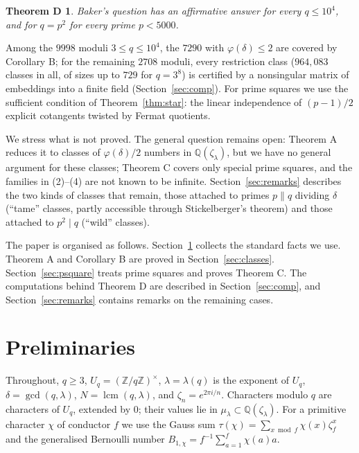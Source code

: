 \documentclass[11pt]{amsart}
\newtheorem*{mainD}{Theorem D}
\theoremstyle{definition}
\theoremstyle{remark}
\providecommand{\Q}{\mathbb Q}
\providecommand{\Z}{\mathbb Z}
\numberwithin{equation}{section}
\begin{document}
\begin{mainD}
Baker's question has an affirmative answer for every $q\le 10^4$, and for $q=p^2$ for every prime $p<5000$.
\end{mainD}

Among the $9998$ moduli $3\le q\le10^4$, the $7290$ with $\varphi(\delta)\le2$ are covered by Corollary B; for the remaining $2708$ moduli, every restriction class ($964{,}083$ classes in all, of sizes up to $729$ for $q=3^8$) is certified by a nonsingular matrix of embeddings into a finite field (Section~\ref{sec:comp}).
For prime squares we use the sufficient condition of Theorem~\ref{thm:star}: the linear independence of $(p-1)/2$ explicit cotangents twisted by Fermat quotients.

We stress what is not proved.
The general question remains open: Theorem A reduces it to classes of $\varphi(\delta)/2$ numbers in $\Q(\zeta_\lambda)$, but we have no general argument for these classes; Theorem C covers only special prime squares, and the families in (2)--(4) are not known to be infinite.
Section~\ref{sec:remarks} describes the two kinds of classes that remain, those attached to primes $p\parallel q$ dividing $\delta$ (``tame'' classes, partly accessible through Stickelberger's theorem) and those attached to $p^2\mid q$ (``wild'' classes).

The paper is organised as follows.
Section~\ref{sec:prelim} collects the standard facts we use.
Theorem A and Corollary B are proved in Section~\ref{sec:classes}.
Section~\ref{sec:psquare} treats prime squares and proves Theorem C.
The computations behind Theorem D are described in Section~\ref{sec:comp}, and Section~\ref{sec:remarks} contains remarks on the remaining cases.
\section{Preliminaries}\label{sec:prelim}

Throughout, $q\ge3$, $U_q=(\Z/q\Z)^\times$, $\lambda=\lambda(q)$ is the exponent of $U_q$, $\delta=\gcd(q,\lambda)$, $N=\operatorname{lcm}(q,\lambda)$, and $\zeta_n=e^{2\pi i/n}$.
Characters modulo $q$ are characters of $U_q$, extended by $0$; their values lie in $\mu_\lambda\subset\Q(\zeta_\lambda)$.
For a primitive character $\chi$ of conductor $f$ we use the Gauss sum $\tau(\chi)=\sum_{x\bmod f}\chi(x)\zeta_f^x$ and the generalised Bernoulli number $B_{1,\chi}=f^{-1}\sum_{a=1}^{f}\chi(a)a$.
\end{document}
